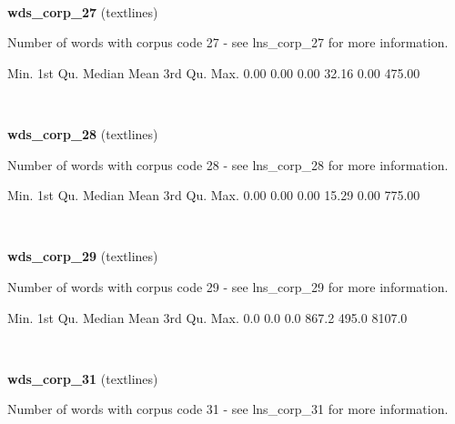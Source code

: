 \documentclass[]{article}
\newenvironment{Shaded}{\begin{snugshade}}{\end{snugshade}}
\newcommand{\FloatTok}[1]{\textcolor[rgb]{0.00,0.00,0.81}{{#1}}}
\newcommand{\NormalTok}[1]{{#1}}
\begin{document}
~

\vspace{1em}

\textbf{wds\_corp\_27} (textlines)

Number of words with corpus code 27 - see lns\_corp\_27 for more
information.

\begin{Shaded}
\begin{Highlighting}[]
   \NormalTok{Min. 1st Qu.  Median    Mean 3rd Qu.    Max. }
   \FloatTok{0.00}    \FloatTok{0.00}    \FloatTok{0.00}   \FloatTok{32.16}    \FloatTok{0.00}  \FloatTok{475.00} 
\end{Highlighting}
\end{Shaded}

~

\vspace{1em}

\textbf{wds\_corp\_28} (textlines)

Number of words with corpus code 28 - see lns\_corp\_28 for more
information.

\begin{Shaded}
\begin{Highlighting}[]
   \NormalTok{Min. 1st Qu.  Median    Mean 3rd Qu.    Max. }
   \FloatTok{0.00}    \FloatTok{0.00}    \FloatTok{0.00}   \FloatTok{15.29}    \FloatTok{0.00}  \FloatTok{775.00} 
\end{Highlighting}
\end{Shaded}

~

\vspace{1em}

\textbf{wds\_corp\_29} (textlines)

Number of words with corpus code 29 - see lns\_corp\_29 for more
information.

\begin{Shaded}
\begin{Highlighting}[]
   \NormalTok{Min. 1st Qu.  Median    Mean 3rd Qu.    Max. }
    \FloatTok{0.0}     \FloatTok{0.0}     \FloatTok{0.0}   \FloatTok{867.2}   \FloatTok{495.0}  \FloatTok{8107.0} 
\end{Highlighting}
\end{Shaded}

~

\vspace{1em}

\textbf{wds\_corp\_31} (textlines)

Number of words with corpus code 31 - see lns\_corp\_31 for more
information.
\end{document}
